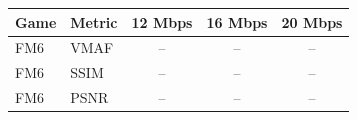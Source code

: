 \begin{tabular}{llccc}
\toprule
Game & Metric & 12 Mbps & 16 Mbps & 20 Mbps \\
\midrule
FM6 & VMAF & -- & -- & -- \\
FM6 & SSIM & -- & -- & -- \\
FM6 & PSNR & -- & -- & -- \\
\bottomrule
\end{tabular}
